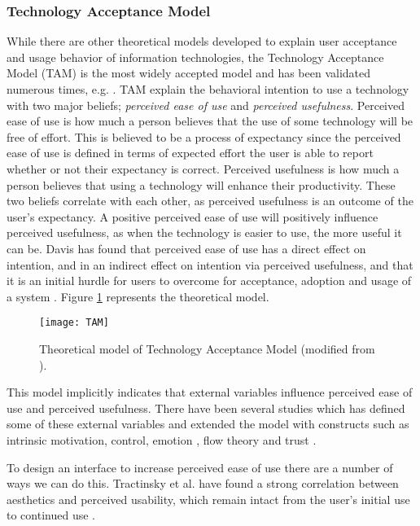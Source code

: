 \subsubsection{Technology Acceptance Model}
While there are other theoretical models developed to explain user acceptance and usage behavior of information technologies, the Technology Acceptance Model (TAM) \cite{Davis1989} \cite{Davis1989a} is the most widely accepted model and has been validated numerous times, e.g. \cite{Hu1999} \cite{Chau1996} \cite{Mathieson1991}. TAM explain the behavioral intention to use a technology with two major beliefs; \textit{perceived ease of use} and \textit{perceived usefulness}. Perceived ease of use is how much a person believes that the use of some technology will be free of effort. This is believed to be a process of expectancy since the perceived ease of use is defined in terms of expected effort the user is able to report whether or not their expectancy is correct. Perceived usefulness is how much a person believes that using a technology will enhance their productivity. These two beliefs correlate with each other, as perceived usefulness is an outcome of the user's expectancy. A positive perceived ease of use will positively influence perceived usefulness, as when the technology is easier to use, the more useful it can be. Davis \cite{Davis1989} has found that perceived ease of use has a direct effect on intention, and in an indirect effect on intention via perceived usefulness, and that it is an initial hurdle for users to overcome for acceptance, adoption and usage of a system \cite{Davis1989a}. Figure \ref{fig:TAM} represents the theoretical model.

\begin{figure}[h]
  \centering
    \texttt{[image: TAM]}
  \caption{Theoretical model of Technology Acceptance Model (modified from \cite{Davis1989}).}
  \label{fig:TAM}
\end{figure}

This model implicitly indicates that external variables influence perceived ease of use and perceived usefulness. There have been several studies which has defined some of these external variables and extended the model with constructs such as intrinsic motivation, control, emotion \cite{Venkatesh2000}, flow theory \cite{Koufaris2002} and trust \cite{Gefen2003}.

To design an interface to increase perceived ease of use there are a number of ways we can do this. Tractinsky et al. have found a strong correlation between aesthetics and perceived usability, which remain intact from the user's initial use to continued use \cite{Tractinsky2000}.

